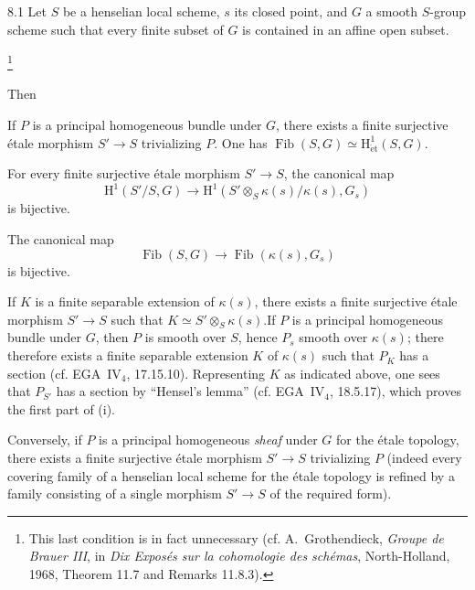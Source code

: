 \begin{proposition}{8.1}\label{XXIV.8.1}
Let $S$ be a henselian local scheme, $s$ its closed point, and $G$ a smooth $S$-group scheme such that every finite subset of $G$ is contained in an affine open subset.{{\renewcommand{\thefootnote}{*}\addtocounter{footnote}{-1}\footnote{This last condition is in fact unnecessary (cf. A.~Grothendieck, \textit{Groupe de Brauer III}, in \textit{Dix Exposés sur la cohomologie des schémas}, North-Holland, 1968, Theorem 11.7 and Remarks 11.8.3).}}}Then
\begin{enumeratei}
\item If $P$ is a principal homogeneous bundle under $G$, there exists a finite surjective étale morphism $S'\to S$ trivializing $P$. One has $\operatorname{Fib}(S,G)\simeq\mathrm H^1_{\mathrm{\acute et}}(S,G)$.
\item For every finite surjective étale morphism $S'\to S$, the canonical map
\[
\mathrm H^1(S'/S,G)\to\mathrm H^1(S'\otimes_S\kappa(s)/\kappa(s),G_s)
\]
is bijective.
\item The canonical map
\[
\operatorname{Fib}(S,G)\to\operatorname{Fib}(\kappa(s),G_s)
\]
is bijective.
\end{enumeratei}
\end{proposition}
\label{XXIV.8.1.2}
If $K$ is a finite separable extension of $\kappa(s)$, there exists a finite surjective étale morphism $S'\to S$ such that $K\simeq S'\otimes_S\kappa(s)$.If $P$ is a principal homogeneous bundle under $G$, then $P$ is smooth over $S$, hence $P_s$ smooth over $\kappa(s)$; there therefore exists a finite separable extension $K$ of $\kappa(s)$ such that $P_K$ has a section (cf. EGA~IV$_4$, 17.15.10). Representing $K$ as indicated above, one sees that $P_{S'}$ has a section by ``Hensel's lemma'' (cf. EGA~IV$_4$, 18.5.17), which proves the first part of (i).

Conversely, if $P$ is a principal homogeneous \emph{sheaf} under $G$ for the étale topology, there exists a finite surjective étale morphism $S'\to S$ trivializing $P$ (indeed every covering family of a henselian local scheme for the étale topology is refined by a family consisting of a single morphism $S'\to S$ of the required form).

